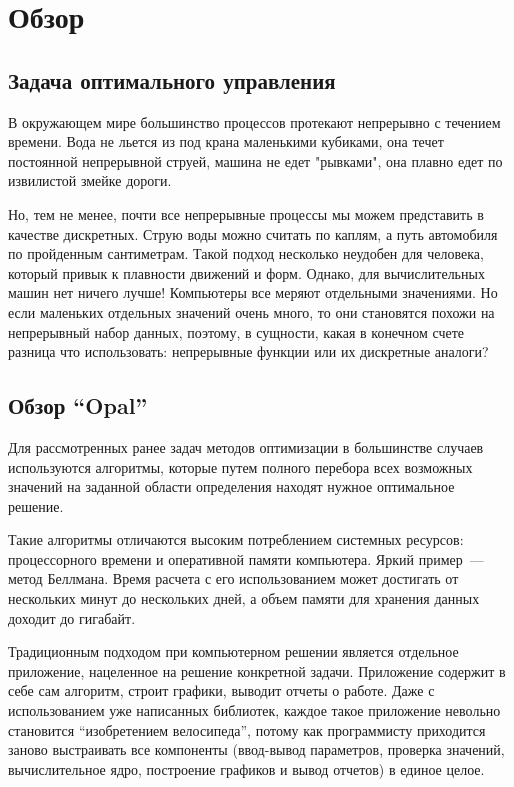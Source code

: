 \chapter{Обзор}

\section{Задача оптимального управления}

В окружающем мире большинство процессов протекают непрерывно с течением времени. Вода не льется из под крана маленькими кубиками, она течет постоянной непрерывной струей, машина не едет "рывками", она плавно едет по извилистой змейке дороги.

Но, тем не менее, почти все непрерывные процессы мы можем представить в качестве дискретных. Струю воды можно считать по каплям, а путь автомобиля по пройденным сантиметрам. Такой подход несколько неудобен для человека, который привык к плавности движений и форм. Однако, для вычислительных машин нет ничего лучше! Компьютеры все меряют отдельными значениями. Но если маленьких отдельных значений очень много, то они становятся похожи на непрерывный набор данных, поэтому, в сущности, какая в конечном счете разница что использовать: непрерывные функции или их дискретные аналоги?

\section{Обзор “Opal”}

Для рассмотренных ранее задач методов оптимизации в большинстве случаев используются алгоритмы, которые путем полного перебора всех возможных значений на заданной области определения находят нужное оптимальное решение.

Такие алгоритмы отличаются высоким потреблением системных ресурсов: процессорного времени и оперативной памяти компьютера. Яркий пример~--- метод Беллмана. Время расчета с его использованием может достигать от нескольких минут до нескольких дней, а объем памяти для хранения данных доходит до гигабайт.

Традиционным подходом при компьютерном решении является отдельное приложение, нацеленное на решение конкретной задачи. Приложение содержит в себе сам алгоритм, строит графики, выводит отчеты о работе. Даже с использованием уже написанных библиотек, каждое такое приложение невольно становится “изобретением велосипеда”, потому как программисту приходится заново выстраивать все компоненты (ввод-вывод параметров, проверка значений, вычислительное ядро, построение графиков и вывод отчетов) в единое целое. 

